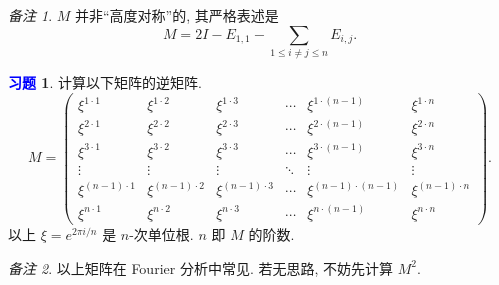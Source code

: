 \documentclass[11pt]{ctexart}
\theoremstyle{definition}
\numberwithin{equation}{section}
\theoremstyle{definition}
\newtheorem{exercise}{\textcolor{blue}{习题}}
\theoremstyle{remark}
\newtheorem*{remark}{备注}
\begin{document}
\begin{remark}
    $M$ 并非``高度对称''的, 其严格表述是
    \begin{equation}
        M=2I-E_{1,1}-\sum_{1\leq i\neq j\leq n}E_{i,j}.
    \end{equation}
\end{remark}

\begin{exercise}
    计算以下矩阵的逆矩阵. 
    \begin{equation}
        M=\begin{pmatrix}
            \xi ^{1\cdot 1} & \xi ^{1\cdot 2} & \xi ^{1\cdot 3} & \cdots  & \xi ^{1\cdot ( n-1)} & \xi ^{1\cdot n}\\
            \xi ^{2\cdot 1} & \xi ^{2\cdot 2} & \xi ^{2\cdot 3} & \cdots  & \xi ^{2\cdot ( n-1)} & \xi ^{2\cdot n}\\
            \xi ^{3\cdot 1} & \xi ^{3\cdot 2} & \xi ^{3\cdot 3} & \cdots  & \xi ^{3\cdot ( n-1)} & \xi ^{3\cdot n}\\
            \vdots  & \vdots  & \vdots  & \ddots  & \vdots  & \vdots \\
            \xi ^{( n-1) \cdot 1} & \xi ^{( n-1) \cdot 2} & \xi ^{( n-1) \cdot 3} & \cdots  & \xi ^{( n-1) \cdot ( n-1)} & \xi ^{( n-1) \cdot n}\\
            \xi ^{n\cdot 1} & \xi ^{n\cdot 2} & \xi ^{n\cdot 3} & \cdots  & \xi ^{n\cdot ( n-1)} & \xi ^{n\cdot n}
            \end{pmatrix}.
    \end{equation}
    以上 $\xi=e^{2\pi i/n}$ 是 $n$-次单位根. $n$ 即 $M$ 的阶数. 
\end{exercise}

\begin{remark}
    以上矩阵在 Fourier 分析中常见. 若无思路, 不妨先计算 $M^2$. 
\end{remark}
\end{document}
